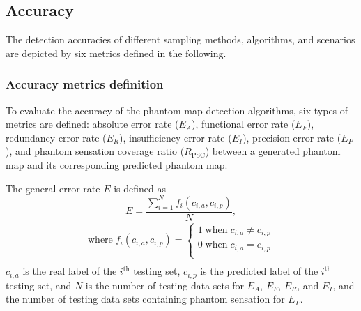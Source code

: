 \subsection{Accuracy}
\label{chap2:sec:results:subsec:accuracy}

The detection accuracies of different sampling methods, algorithms, and scenarios are depicted  by six metrics defined in the following.
\subsubsection{Accuracy metrics definition}
\label{subsubsec:Accuracy metrics definition}
To evaluate the accuracy of the phantom map detection algorithms, six types of metrics are defined: absolute error rate ($E_A$), functional error rate ($E_F$), redundancy error rate ($E_R$), insufficiency error rate ($E_I$),  precision error rate ($E_P$), and phantom sensation coverage ratio ($R_\text{PSC}$) between a generated phantom map and its corresponding predicted phantom map. 

The general error rate $E$ is defined as
\begin{equation}
\label{Eq:ErrorRate}
   E = \frac{ \sum_{i=1}^{N} f_i(c_{i,a},c_{i,p}) }{N}, 
\end{equation}
 \begin{gather*}
   \text{where} \; f_i(c_{i,a},c_{i,p}) = \left\{
                \begin{array}{ll}
                  1 \; \text{when} \; c_{i,a} \neq c_{i,p}\\
                  0 \; \text{when} \; c_{i,a} = c_{i,p}   \nonumber\\
                \end{array}
              \right. 
              \\                                 
\end{gather*}
$ c_{i,a}$ is the real label of the $i^{\text{th}}$ testing set,  $ c_{i,p}$ is the predicted label of the $i^{\text{th}}$ testing set, and $N$ is the number of testing data sets for $E_A$, $E_F$, $E_R$, and $E_I$, and the number of testing data sets containing phantom sensation for $E_P$.

